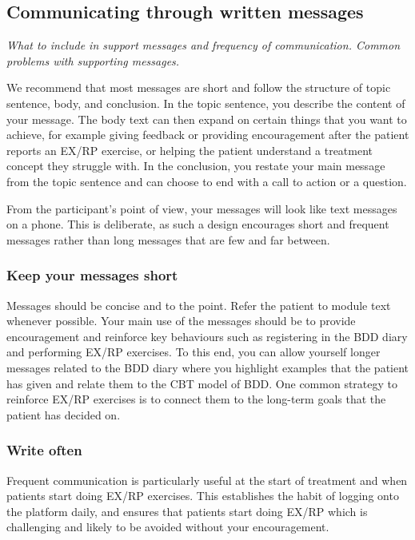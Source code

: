 \documentclass[]{book}
\theoremstyle{definition}
\theoremstyle{definition}
\theoremstyle{definition}
\theoremstyle{remark}
\begin{document}
\hypertarget{communicating-through-written-messages-1}{%
\subsection{Communicating through written
messages}\label{communicating-through-written-messages-1}}

\emph{What to include in support messages and frequency of
communication. Common problems with supporting messages.}

We recommend that most messages are short and follow the structure of
topic sentence, body, and conclusion. In the topic sentence, you
describe the content of your message. The body text can then expand on
certain things that you want to achieve, for example giving feedback or
providing encouragement after the patient reports an EX/RP exercise, or
helping the patient understand a treatment concept they struggle with.
In the conclusion, you restate your main message from the topic sentence
and can choose to end with a call to action or a question.

From the participant's point of view, your messages will look like text
messages on a phone. This is deliberate, as such a design encourages
short and frequent messages rather than long messages that are few and
far between.

\hypertarget{keep-your-messages-short-1}{%
\subsubsection{Keep your messages
short}\label{keep-your-messages-short-1}}

Messages should be concise and to the point. Refer the patient to module
text whenever possible. Your main use of the messages should be to
provide encouragement and reinforce key behaviours such as registering
in the BDD diary and performing EX/RP exercises. To this end, you can
allow yourself longer messages related to the BDD diary where you
highlight examples that the patient has given and relate them to the CBT
model of BDD. One common strategy to reinforce EX/RP exercises is to
connect them to the long-term goals that the patient has decided on.

\hypertarget{write-often-1}{%
\subsubsection{Write often}\label{write-often-1}}

Frequent communication is particularly useful at the start of treatment
and when patients start doing EX/RP exercises. This establishes the
habit of logging onto the platform daily, and ensures that patients
start doing EX/RP which is challenging and likely to be avoided without
your encouragement.
\end{document}
